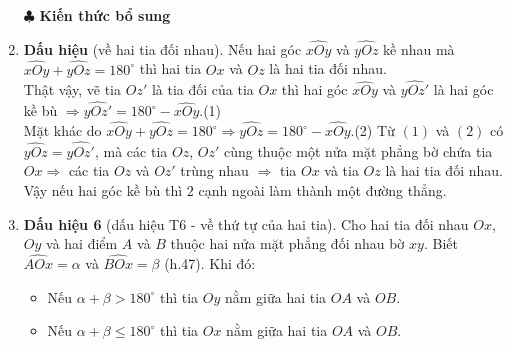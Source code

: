 \begin{enumerate}
	$\clubsuit$ \textbf{Kiến thức bổ sung}
	\item \textbf{Dấu hiệu} (về hai tia đối nhau). Nếu hai góc $\widehat{xOy}$ và $\widehat{yOz}$ kề nhau mà $\widehat{xOy}+\widehat{yOz}=180^\circ$ thì hai tia $Ox$ và $Oz$ là hai tia đối nhau.\\
	Thật vậy, vẽ tia $Oz'$ là tia đối của tia $Ox$ thì hai góc $\widehat{xOy}$ và $\widehat{yOz'}$ là hai góc kề bù $\Rightarrow \widehat{yOz'}=180^\circ-\widehat{xOy}$.\hfill (1)\\
	Mặt khác do $\widehat{xOy}+\widehat{yOz}=180^\circ\Rightarrow
		\widehat{yOz}=180^\circ-\widehat{xOy}$.\hfill(2)
\immini
{Từ $(1)$ và $(2)$ có $\widehat{yOz}=\widehat{yOz'}$, mà các tia $Oz$, $Oz'$ cùng thuộc một nửa mặt phẳng bờ chứa tia $Ox\Rightarrow$ các tia $Oz$ và $Oz'$ trùng nhau $\Rightarrow$ tia $Ox$ và tia $Oz$ là hai tia đối nhau.\\
Vậy nếu hai góc kề bù thì $2$ cạnh ngoài làm thành một đường thẳng.
	}
{
}
	\item \textbf{Dấu hiệu 6} (dấu hiệu T6 - về thứ tự của hai tia). Cho hai tia đối nhau $Ox$, $Oy$ và hai điểm $A$ và $B$ thuộc hai nửa mặt phẳng đối nhau bờ $xy$. Biết $\widehat{AOx}=\alpha$ và $\widehat{BOx}=\beta$ (h.47). Khi đó: 
	\begin{itemize}
		\item Nếu $\alpha+\beta>180^\circ$ thì tia $Oy$ nằm giữa hai tia $OA$ và $OB$.
		\item Nếu $\alpha+\beta\leq 180^\circ$ thì tia $Ox$ nằm giữa hai tia $OA$ và $OB$.
		\begin{center}
		\begin{tikzpicture}[>=stealth,line join=round,line cap=round,font=\footnotesize,scale=0.8]

\end{tikzpicture}
\end{center}
\end{itemize}
\end{enumerate}
